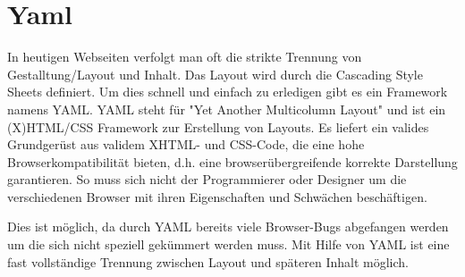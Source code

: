 \section{Yaml}
\label{JumpYaml}
In heutigen Webseiten verfolgt man oft die strikte Trennung von Gestalltung/Layout und Inhalt. Das Layout wird durch die Cascading Style Sheets definiert. Um dies schnell und einfach zu erledigen gibt es ein Framework namens YAML. YAML steht für "Yet Another Multicolumn Layout" und ist ein (X)HTML/CSS Framework zur Erstellung von Layouts. Es liefert ein valides Grundgerüst aus validem XHTML- und CSS-Code, die eine hohe Browserkompatibilität bieten, d.h. eine browserübergreifende korrekte Darstellung garantieren. So muss sich nicht der Programmierer oder Designer um die verschiedenen Browser mit ihren Eigenschaften und Schwächen beschäftigen. 

Dies ist möglich, da durch YAML bereits viele Browser-Bugs abgefangen werden um die sich nicht speziell gekümmert werden muss.
Mit Hilfe von YAML ist eine fast vollständige Trennung zwischen Layout und späteren Inhalt möglich. 

